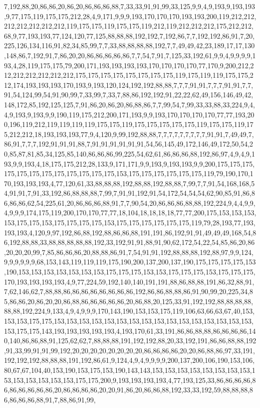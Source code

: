 7,192,88,20,86,86,20,86,20,86,86,86,88,7,33,33,91,91,99,33,125,9,9,4,9,193,9,193,193,9,77,175,119,175,175,212,28,4,9,171,9,9,9,193,170,170,170,193,193,200,119,212,212,212,212,212,212,212,119,175,175,119,175,175,119,212,119,212,212,212,175,212,212,68,9,77,193,193,77,124,120,77,125,88,88,88,192,192,7,192,86,7,7,192,192,86,91,7,20,225,126,134,116,91,82,34,85,99,7,7,33,88,88,88,88,192,7,7,49,49,42,23,189,17,17,130,148,86,7,192,91,7,86,20,20,86,86,86,86,86,7,7,54,7,91,7,125,33,192,61,9,9,4,9,9,9,9,193,4,28,119,175,175,79,200,171,193,193,193,193,170,170,170,170,77,170,9,200,212,212,212,212,212,212,212,175,175,175,175,175,175,175,175,119,175,119,119,175,175,212,174,193,193,193,170,193,9,193,120,124,192,192,88,88,7,7,7,91,91,7,7,7,91,91,7,7,91,54,124,99,54,91,90,99,7,33,99,7,33,7,88,86,192,192,91,22,22,62,49,156,146,49,42,148,172,85,192,125,125,7,91,86,20,86,20,86,88,86,7,7,99,54,7,99,33,33,88,33,224,9,4,4,9,193,9,193,9,9,190,119,175,212,200,171,193,9,9,193,170,170,170,170,77,77,193,200,196,119,212,119,119,119,119,175,175,119,175,175,175,175,175,119,175,175,119,175,212,212,18,193,193,193,77,9,4,120,9,99,192,88,88,7,7,7,7,7,7,7,7,7,91,91,7,49,49,7,86,91,7,7,7,192,91,91,91,88,7,91,91,91,91,91,91,54,56,145,49,172,146,49,172,50,54,20,85,87,81,85,34,125,85,140,86,86,86,99,225,54,62,61,86,86,86,88,192,86,97,4,9,4,9,193,9,9,193,4,18,175,175,212,28,133,9,171,171,9,9,193,9,193,193,9,9,200,175,175,175,175,175,175,175,175,175,175,175,175,153,175,175,175,175,175,175,119,79,190,170,170,193,193,193,4,77,120,61,33,88,88,88,192,88,88,192,88,88,7,99,7,7,91,54,168,168,54,91,91,7,91,33,192,86,88,88,88,7,99,7,91,91,192,91,54,172,54,54,54,62,90,85,91,86,86,86,86,62,54,225,61,20,86,86,86,88,91,7,7,90,54,20,86,86,86,88,88,192,224,9,4,4,9,9,4,9,9,9,174,175,119,200,170,170,77,77,18,104,18,18,18,18,77,77,200,175,153,153,153,153,175,175,153,175,175,175,175,153,175,175,175,175,175,175,119,79,28,193,77,193,193,193,4,120,9,97,192,86,88,192,88,86,86,88,191,191,86,192,91,91,49,49,49,168,54,86,192,88,88,33,88,88,88,88,88,192,33,192,91,91,88,91,90,62,172,54,22,54,85,86,20,86,20,20,20,99,7,85,86,86,86,20,88,88,86,91,7,54,91,91,192,88,88,88,192,88,97,9,9,124,9,9,9,9,9,9,68,153,143,119,119,119,175,190,200,137,200,137,190,175,175,175,175,153,190,153,153,153,153,153,153,153,175,175,175,153,153,175,175,175,153,175,175,175,170,193,193,193,193,4,9,77,224,59,192,140,140,191,191,88,86,88,88,191,86,32,88,91,7,62,146,62,7,88,88,86,86,86,86,86,86,86,86,192,86,86,88,88,86,91,90,99,20,225,34,85,86,86,20,86,20,20,86,88,86,86,86,86,86,20,86,88,20,125,33,91,192,192,88,88,88,88,88,88,192,224,9,133,4,9,4,9,9,9,170,143,190,153,153,175,119,106,63,66,63,67,40,153,153,153,175,175,153,153,153,153,153,153,153,153,153,153,153,153,153,153,153,153,153,175,175,143,193,193,193,193,193,4,193,170,61,33,191,86,86,88,88,86,86,86,86,140,140,86,86,88,91,125,62,62,7,88,88,88,191,192,192,88,20,33,192,191,86,86,88,88,192,91,33,99,91,91,99,192,20,20,20,20,20,20,20,20,86,86,86,86,20,20,86,88,86,97,33,191,192,192,192,88,88,88,191,192,86,61,9,124,4,9,4,9,9,9,9,200,137,200,106,190,153,106,80,67,67,104,40,153,190,153,175,153,190,143,143,153,153,153,153,153,153,153,153,153,153,153,153,153,153,175,175,200,9,193,193,193,193,4,77,193,125,33,86,86,86,86,86,86,86,86,86,86,20,86,86,86,86,20,20,91,86,20,86,86,88,192,33,33,192,59,88,88,88,86,86,86,86,88,91,7,88,86,91,99,